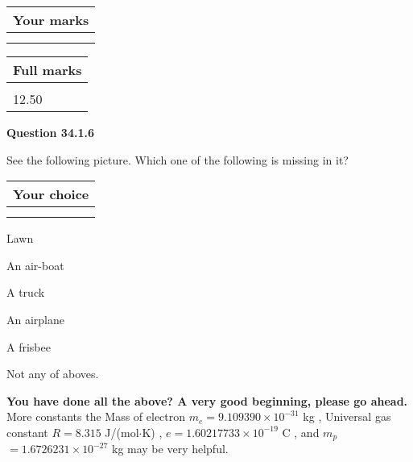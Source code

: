 \documentclass[12pt]{article}
\begin{document}
 

 
\vspace{0.3in}
  
\vspace{0.2in}
  
         \begin{tabular}{|l|}
\hline
 Your marks  \\
\hline
 \\ 
 \\ 
\hline
\end{tabular}
\hspace{0.05in} \begin{tabular}{|l|}
\hline
 Full marks  \\
\hline
 \\ 
12.50 \\
\hline
\end{tabular}
{\textbf{\Large{Question
34.1.6 
}}}
  
  
See the following picture.
Which one of the following is missing in it?
  
  
\noindent\hspace{3.0in} \begin{tabular}{|l|}
\hline
Your choice \\
\hline
 \\ 
 \\ 
\hline
\end{tabular}
  
  
 
 
Lawn
 
 
An air-boat
 
 
A truck
 
 
An airplane
 
 
A frisbee
 
 
  Not any of aboves.
 
 
 
\vspace{0.3in}
   
   
\vspace{0.3in}
{\textbf{\LARGE{You have done all the above? A very good beginning, please go ahead.}}}
More constants the
Mass of electron
$m_e$$ =
9.109390 \times 10^{-31} $
kg
,
Universal gas constant
$R$$ =
8.315 $
J/(mol$\cdot $K)
,
$e$$ =
1.60217733 \times 10^{-19} $
C
, and
$m_p$$ =
1.6726231 \times 10^{-27} $
kg
%
may be very helpful.
\vspace{0.3in}
   
\end{document}
